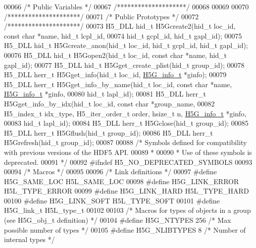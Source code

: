 \begin{DoxyCode}
00066 \textcolor{comment}{/* Public Variables */}
00067 \textcolor{comment}{/********************/}
00068 
00069 
00070 \textcolor{comment}{/*********************/}
00071 \textcolor{comment}{/* Public Prototypes */}
00072 \textcolor{comment}{/*********************/}
00073 H5\_DLL hid\_t H5Gcreate2(hid\_t loc\_id, \textcolor{keyword}{const} \textcolor{keywordtype}{char} *name, hid\_t lcpl\_id,
00074     hid\_t gcpl\_id, hid\_t gapl\_id);
00075 H5\_DLL hid\_t H5Gcreate\_anon(hid\_t loc\_id, hid\_t gcpl\_id, hid\_t gapl\_id);
00076 H5\_DLL hid\_t H5Gopen2(hid\_t loc\_id, \textcolor{keyword}{const} \textcolor{keywordtype}{char} *name, hid\_t gapl\_id);
00077 H5\_DLL hid\_t H5Gget\_create\_plist(hid\_t group\_id);
00078 H5\_DLL herr\_t H5Gget\_info(hid\_t loc\_id, \hyperlink{struct_h5_g__info__t}{H5G\_info\_t} *ginfo);
00079 H5\_DLL herr\_t H5Gget\_info\_by\_name(hid\_t loc\_id, \textcolor{keyword}{const} \textcolor{keywordtype}{char} *name, \hyperlink{struct_h5_g__info__t}{H5G\_info\_t} *ginfo,
00080     hid\_t lapl\_id);
00081 H5\_DLL herr\_t H5Gget\_info\_by\_idx(hid\_t loc\_id, \textcolor{keyword}{const} \textcolor{keywordtype}{char} *group\_name,
00082     H5\_index\_t idx\_type, H5\_iter\_order\_t order, hsize\_t n, \hyperlink{struct_h5_g__info__t}{H5G\_info\_t} *ginfo,
00083     hid\_t lapl\_id);
00084 H5\_DLL herr\_t H5Gclose(hid\_t group\_id);
00085 H5\_DLL herr\_t H5Gflush(hid\_t group\_id);
00086 H5\_DLL herr\_t H5Grefresh(hid\_t group\_id);
00087 
00088 \textcolor{comment}{/* Symbols defined for compatibility with previous versions of the HDF5 API.}
00089 \textcolor{comment}{ *}
00090 \textcolor{comment}{ * Use of these symbols is deprecated.}
00091 \textcolor{comment}{ */}
00092 \textcolor{preprocessor}{#ifndef H5\_NO\_DEPRECATED\_SYMBOLS}
00093 
00094 \textcolor{comment}{/* Macros */}
00095 
00096 \textcolor{comment}{/* Link definitions */}
00097 \textcolor{preprocessor}{#define H5G\_SAME\_LOC H5L\_SAME\_LOC}
00098 \textcolor{preprocessor}{#define H5G\_LINK\_ERROR H5L\_TYPE\_ERROR}
00099 \textcolor{preprocessor}{#define H5G\_LINK\_HARD H5L\_TYPE\_HARD}
00100 \textcolor{preprocessor}{#define H5G\_LINK\_SOFT H5L\_TYPE\_SOFT}
00101 \textcolor{preprocessor}{#define H5G\_link\_t H5L\_type\_t}
00102 
00103 \textcolor{comment}{/* Macros for types of objects in a group (see H5G\_obj\_t definition) */}
00104 \textcolor{preprocessor}{#define H5G\_NTYPES  256     }\textcolor{comment}{/* Max possible number of types */}\textcolor{preprocessor}{}
00105 \textcolor{preprocessor}{#define H5G\_NLIBTYPES   8       }\textcolor{comment}{/* Number of internal types */}\textcolor{preprocessor}{}

\end{DoxyCode}
